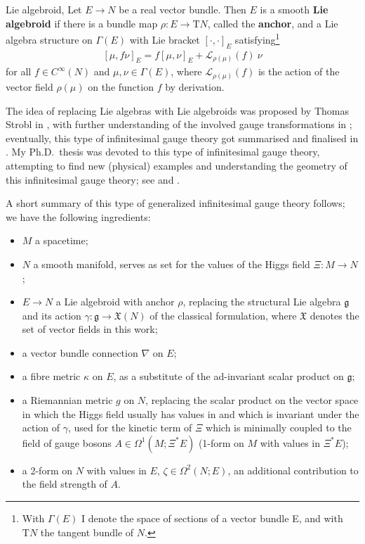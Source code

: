 \documentclass[a4paper,oneside,11pt,bibliography=totoc]{scrartcl}
\theoremstyle{plain}
\theoremstyle{remark}
\theoremstyle{definition}
\begin{document}
\begin{definitions*}{Lie algebroid,  \cite[reduced definition of \S 16.1, page 113]{DaSilva}}
Let $E \to N$ be a real vector bundle. Then $E$ is a smooth \textbf{Lie algebroid} if there is a bundle map $\rho: E \to \mathrm{T}N$, called the \textbf{anchor}, and a Lie algebra structure on $\Gamma(E)$ with Lie bracket $\left[ \cdot, \cdot \right]_E$ satisfying\footnote{With $\Gamma(E)$ I denote the space of sections of a vector bundle E, and with $\mathrm{T}N$ the tangent bundle of $N$.}
\begin{align*}
  \left[\mu, f \nu\right]_E = f \left[\mu, \nu\right]_E + \mathcal{L}_{\rho(\mu)}(f) ~ \nu
\end{align*}
for all $f \in C^\infty(N)$ and $\mu, \nu \in \Gamma(E)$, where $\mathcal{L}_{\rho(\mu)}(f)$ is the action of the vector field $\rho(\mu)$ on the function $f$ by derivation.
\end{definitions*}

The idea of replacing Lie algebras with Lie algebroids was proposed by Thomas Strobl in \cite{OriginofCYMH}, with further understanding of the involved gauge transformations in \cite{mayer2009lie}; eventually, this type of infinitesimal gauge theory got summarised and finalised in \cite{CurvedYMH}. My Ph.D.\ thesis was devoted to this type of infinitesimal gauge theory, attempting to find new (physical) examples and understanding the geometry of this infinitesimal gauge theory; see \cite{My1stpaper} and \cite{MyThesis}.

A short summary of this type of generalized infinitesimal gauge theory follows; we have the following ingredients:
\begin{itemize}
	\item $M$ a spacetime;
	\item $N$ a smooth manifold, serves as set for the values of the Higgs field $\Xi: M \to N$;
	\item $E \to N$ a Lie algebroid with anchor $\rho$, replacing the structural Lie algebra $\mathfrak{g}$ and its action $\gamma: \mathfrak{g} \to \mathfrak{X}(N)$ of the classical formulation, where $\mathfrak{X}$ denotes the set of vector fields in this work;
	\item a vector bundle connection $\nabla$ on $E$;
	\item a fibre metric $\kappa$ on $E$, as a substitute of the ad-invariant scalar product on $\mathfrak{g}$;
	\item a Riemannian metric $g$ on $N$, replacing the scalar product on the vector space in which the Higgs field usually has values in and which is invariant under the action of $\gamma$, used for the kinetic term of $\Xi$ which is minimally coupled to the field of gauge bosons $A \in \Omega^1(M; \Xi^*E)$ (1-form on $M$ with values in $\Xi^*E$);
	\item a 2-form on $N$ with values in $E$, $\zeta \in \Omega^2(N;E)$, an additional contribution to the field strength of $A$.
\end{itemize}
\end{document}
